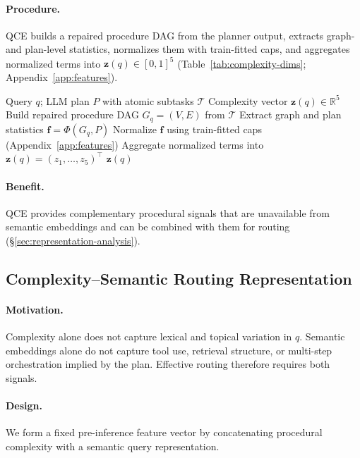 \paragraph{Procedure.}
QCE builds a repaired procedure DAG from the planner output, extracts graph- and plan-level
statistics, normalizes them with train-fitted caps, and aggregates normalized terms into
$\mathbf{z}(q)\in[0,1]^5$ (Table~\ref{tab:complexity-dims}; Appendix~\ref{app:features}).

\begin{algorithm}[t]
  \caption{Graph-aware query complexity estimation (QCE)}
  \label{alg:qce}
  \small
  \begin{algorithmic}[1]
    \Require Query $q$; LLM plan $P$ with atomic subtasks $\mathcal{T}$
    \Ensure Complexity vector $\mathbf{z}(q)\in\mathbb{R}^5$
    \State Build repaired procedure DAG $G_q=(V,E)$ from $\mathcal{T}$
    \State Extract graph and plan statistics $\mathbf{f}=\Phi(G_q,P)$
    \State Normalize $\mathbf{f}$ using train-fitted caps (Appendix~\ref{app:features})
    \State Aggregate normalized terms into $\mathbf{z}(q)=(z_1,\ldots,z_5)^\top$
    \State \Return $\mathbf{z}(q)$
  \end{algorithmic}
\end{algorithm}

\paragraph{Benefit.}
QCE provides complementary procedural signals that are unavailable from semantic embeddings
and can be combined with them for routing (\S\ref{sec:representation-analysis}).

\subsection{Complexity--Semantic Routing Representation}
\label{sec:method-representation}

\paragraph{Motivation.}
Complexity alone does not capture lexical and topical variation in $q$.
Semantic embeddings alone do not capture tool use, retrieval structure, or multi-step
orchestration implied by the plan.
Effective routing therefore requires both signals.

\paragraph{Design.}
We form a fixed pre-inference feature vector by concatenating procedural complexity with
a semantic query representation.

